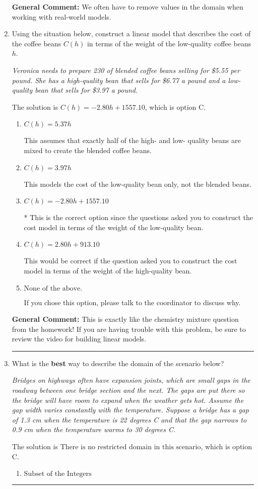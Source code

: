 \documentclass{extbook}[14pt]
\newcommand{\litem}[1]{\item #1

\rule{\textwidth}{0.4pt}}
\begin{document}
\begin{enumerate}
{\textbf{General Comment:} We often have to remove values in the domain when working with real-world models.
}
\litem{
Using the situation below, construct a linear model that describes the cost of the coffee beans $C(h)$ in terms of the weight of the low-quality coffee beans $h$.

\begin{center}
    \textit{ Veronica needs to prepare 230 of blended coffee beans selling for \$5.55 per pound. She has a high-quality bean that sells for \$6.77 a pound and a low-quality bean that sells for \$3.97 a pound. }
\end{center}
The solution is \( C(h) = -2.80 h + 1557.10 \), which is option C.\begin{enumerate}[label=\Alph*.]
\item \( C(h) = 5.37 h \)

This assumes that exactly half of the high- and low- quality beans are mixed to create the blended coffee beans.
\item \( C(h) = 3.97 h \)

This models the cost of the low-quality bean only, not the blended beans.
\item \( C(h) = -2.80 h + 1557.10 \)

* This is the correct option since the questions asked you to construct the cost model in terms of the weight of the low-quality bean.
\item \( C(h) = 2.80 h + 913.10 \)

This would be correct if the question asked you to construct the cost model in terms of the weight of the high-quality bean.
\item \( \text{None of the above.} \)

If you chose this option, please talk to the coordinator to discuss why.
\end{enumerate}

\textbf{General Comment:} This is exactly like the chemistry mixture question from the homework! If you are having trouble with this problem, be sure to review the video for building linear models.
}
\litem{
What is the \textbf{best} way to describe the domain of the scenario below?

\begin{center}
    \textit{ Bridges on highways often have expansion joints, which are small gaps in the roadway between one bridge section and the next. The gaps are put there so the bridge will have room to expand when the weather gets hot. Assume the gap width varies constantly with the temperature. Suppose a bridge has a gap of 1.3 cm when the temperature is 22 degrees C and that the gap narrows to 0.9 cm when the temperature warms to 30 degrees C. }
\end{center}
The solution is \( \text{There is no restricted domain in this scenario} \), which is option C.\begin{enumerate}[label=\Alph*.]
\item \( \text{Subset of the Integers} \)


\end{enumerate}}
\end{enumerate}
\end{document}
